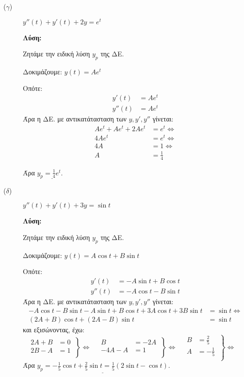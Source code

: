 \documentclass[a4paper,12pt]{article}
\begin{document}
\begin{description}
\vspace{\baselineskip}

\item [($\gamma$)] $\boxed{y''(t)+y'(t) +2y=e^t}$

\textbf{Λύση:}

\vspace{\baselineskip}

Ζητάμε την ειδική λύση $y_p$ της ΔΕ.

Δοκιμάζουμε: $y(t)=Ae^t$

Οπότε:
\begin{align*}
y'(t)&=Ae^t\\
y''(t)&=Ae^t
\end{align*}
Άρα η ΔΕ. με αντικατάτασταση των $y,y',y''$ γίνεται:
\begin{align*}
Ae^t+Ae^t+2Ae^t&=e^t \Leftrightarrow\\
4Ae^t&=e^t \Leftrightarrow\\
4A&=1 \Leftrightarrow\\
A&=\frac{1}{4}
\end{align*}

Άρα $y_p\underline{=\frac{1}{4}e^t}$.

\vspace{\baselineskip}

\item [($\delta$)] $\boxed{y''(t)+y'(t) +3y=\sin t}$

\textbf{Λύση:}

\vspace{\baselineskip}

Ζητάμε την ειδική λύση $y_p$ της ΔΕ.

Δοκιμάζουμε: $y(t)=A\cos t+B\sin t$

Οπότε:
\begin{align*}
y'(t)&=-A\sin t+B\cos t\\
y''(t)&=-A\cos t-B\sin t
\end{align*}
Άρα η ΔΕ. με αντικατάτασταση των $y,y',y''$ γίνεται:
\begin{align*}
-A\cos t-B\sin t -A\sin t+B\cos t+3A\cos t+3B\sin t &=\sin t \Leftrightarrow\\
(2A+B)\cos t +(2A-B)\sin t&=\sin t
\end{align*}
και εξισώνοντας, έχω:
\[
\left.\begin{aligned}
2Α+Β &=0\\
2Β-Α &=1 \\
  \end{aligned}\:\right\}\Leftrightarrow \quad
 \left.\begin{aligned}
Β&=-2Α\\
-4Α-Α&=1 \\
  \end{aligned}\:\right\}\Leftrightarrow \quad
  \left.\begin{aligned}
B&=\frac{2}{5}\\
A&=-\frac{1}{5} \\
  \end{aligned}\:\right\}\Leftrightarrow \quad
\]
Άρα $\underline{y_p=-\frac{1}{5}\cos t +\frac{2}{5}\sin t = \frac{1}{5}(2\sin t-\cos t)}$.
\end{description}
\end{document}
